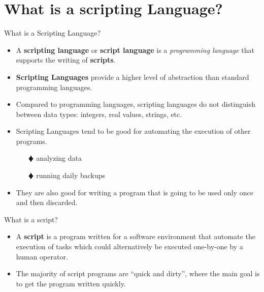 \documentclass[10pt,t]{beamer}
\begin{document}
\section*{What is a scripting Language?}
\begin{frame}
  \begin{exampleblock}{What is a Scripting Language?}
    \begin{itemize}
      \item A \textbf{scripting language} or \textbf{script language} is a \emph{programming language} that supports the writing of \textbf{scripts}.
      \item \textbf{Scripting Languages} provide a higher level of abstraction than standard programming languages.
      \item Compared to programming languages, scripting languages do not distinguish between data types: integers, real values, strings, etc.
      \item Scripting Languages tend to be good for automating the execution of other programs.
      \begin{enumerate}
          \item[$\vardiamond$] analyzing data
          \item[$\vardiamond$] running daily backups
      \end{enumerate}
      \item They are also good for writing a program that is going to be used only once and then discarded.
    \end{itemize}
  \end{exampleblock}
  \begin{exampleblock}{What is a script?}
    \begin{itemize}
      \item A \textbf{script} is a program written for a software environment that automate the execution of tasks which could alternatively be executed one-by-one by a human operator.
      \item The majority of script programs are ``quick and dirty'', where the main goal is to get the program written quickly.
    \end{itemize}
  \end{exampleblock}
\end{frame}
\end{document}

